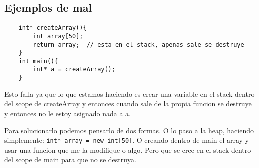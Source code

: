 \documentclass[11pt]{article}
\begin{document}
\subsection{Ejemplos de mal}
\begin{lstlisting}
    int* createArray(){
        int array[50];
        return array;  // esta en el stack, apenas sale se destruye
    }
    int main(){
        int* a = createArray();
    }
\end{lstlisting}

Esto falla ya que lo que estamos haciendo es crear una variable en el stack dentro
del scope de createArray y entonces cuando sale de la propia funcion se destruye
y entonces no le estoy asignado nada a a.

Para solucionarlo podemos pensarlo de dos formas.
O lo paso a la heap, haciendo simplemente: \texttt{int* array = new int[50]}.
O creando dentro de main el array y usar una funcion que me la modifique o algo.
Pero que se cree en el stack dentro del scope de main para que no se destruya.
\end{document}
